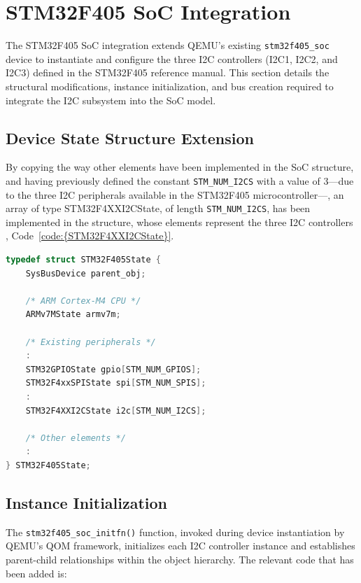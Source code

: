 \section{STM32F405 SoC Integration}
\label{sec:impl_soc}

The STM32F405 SoC integration extends QEMU's existing \texttt{stm32f405\_soc} device to instantiate and configure the three I2C controllers (I2C1, I2C2, and I2C3) defined in the STM32F405 reference manual. This section details the structural modifications, instance initialization, and bus creation required to integrate the I2C subsystem into the SoC model.

\subsection{Device State Structure Extension}

By copying the way other elements have been implemented in the SoC structure, and having previously defined the constant \texttt{STM\_NUM\_I2CS} with a value of 3—due to the three I2C peripherals available in the STM32F405 microcontroller—, an array of type STM32F4XXI2CState, of length \texttt{STM\_NUM\_I2CS}, has been implemented in the structure, whose elements represent the three I2C controllers
, Code~\ref{code:{STM32F4XXI2CState}}.\\

\begin{lstlisting}[language=C, label={code:STM32F405State} caption={STM32F405State structure with I2C integration}]
typedef struct STM32F405State {
    SysBusDevice parent_obj;

    /* ARM Cortex-M4 CPU */
    ARMv7MState armv7m;

    /* Existing peripherals */
    :
    STM32GPIOState gpio[STM_NUM_GPIOS];
    STM32F4xxSPIState spi[STM_NUM_SPIS];
    :
    STM32F4XXI2CState i2c[STM_NUM_I2CS];

    /* Other elements */
    :
} STM32F405State;
\end{lstlisting}

\subsection{Instance Initialization}

The \texttt{stm32f405\_soc\_initfn()} function, invoked during device instantiation by QEMU's QOM framework, initializes each I2C controller instance and establishes parent-child relationships within the object hierarchy. The relevant code that has been added is:

